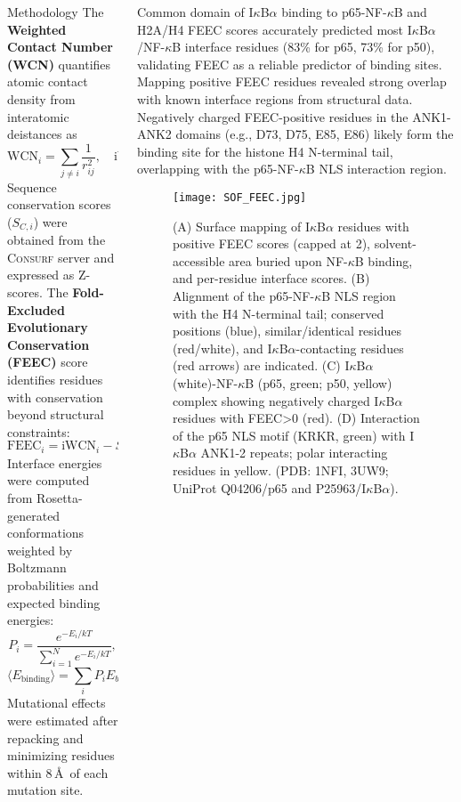 \documentclass[xcolor={table}]{beamer}
\begin{document}
\begin{frame}[fragile=singleslide]
\begin{columns}[onlytextwidth,T]
\begin{column}{.48\textwidth}
\begin{block}{Methodology}
The \textbf{Weighted Contact Number (WCN)} quantifies atomic contact density from interatomic deistances as
\[
\mathrm{WCN}_i = \sum_{j \neq i} \frac{1}{r_{ij}^2}, \quad
\mathrm{iWCN}_i = \frac{1}{\mathrm{WCN}_i}.
\]
Sequence conservation scores (\(S_{C,i}\)) were obtained from the \textsc{Consurf} server and expressed as Z-scores. The \textbf{Fold-Excluded Evolutionary Conservation (FEEC)} score identifies residues with conservation beyond structural constraints:
\[
\mathrm{FEEC}_i = \mathrm{iWCN}_i - S_{C,i}.
\]
Interface energies were computed from Rosetta-generated conformations weighted by Boltzmann probabilities and expected binding energies:
\[
P_i = \frac{e^{-E_i/kT}}{\sum_{i=1}^N e^{-E_i/kT}},
\]
\[
\langle E_{\text{binding}} \rangle = \sum_i P_i E_{b,i}, \quad E_{b,i} = E_{\text{complex},i} - (E_{A,i} + E_{B,i}).
\]
Mutational effects were estimated after repacking and minimizing residues within 8\,\AA\ of each mutation site.
\end{block}

\end{column}


\begin{column}{.48\textwidth}
    \vspace{2ex}%
\begin{block}{Common domain of I$\kappa$B$\alpha$ binding to p65-NF-$\kappa$B and H2A/H4}
FEEC scores accurately predicted most I$\kappa$B$\alpha$/NF-$\kappa$B interface residues (83\% for p65, 73\% for p50), validating FEEC as a reliable predictor of binding sites.
Mapping positive FEEC residues revealed strong overlap with known interface regions from structural data.
Negatively charged FEEC-positive residues in the ANK1-ANK2 domains (e.g., D73, D75, E85, E86) likely form the binding site for the histone H4 N-terminal tail, overlapping with the p65-NF-$\kappa$B NLS interaction region.
\begin{figure}
\texttt{[image: SOF\_FEEC.jpg]}
\caption{(A) Surface mapping of I$\kappa$B$\alpha$ residues with positive FEEC scores (capped at 2), solvent-accessible area buried upon NF-$\kappa$B binding, and per-residue interface scores. 
(B) Alignment of the p65-NF-$\kappa$B NLS region with the H4 N-terminal tail; conserved positions (blue), similar/identical residues (red/white), and I$\kappa$B$\alpha$-contacting residues (red arrows) are indicated. 
(C) I$\kappa$B$\alpha$ (white)-NF-$\kappa$B (p65, green; p50, yellow) complex showing negatively charged I$\kappa$B$\alpha$ residues with FEEC>0  (red). 
(D) Interaction of the p65 NLS motif (KRKR, green) with I$\kappa$B$\alpha$ ANK1-2 repeats; polar interacting residues in yellow. (PDB: 1NFI, 3UW9; UniProt Q04206/p65 and P25963/I$\kappa$B$\alpha$).}
\end{figure}
\end{block}
\end{column}
\end{columns}
 \begin{columns}[onlytextwidth,T]


\end{columns}
\end{frame}
\end{document}
